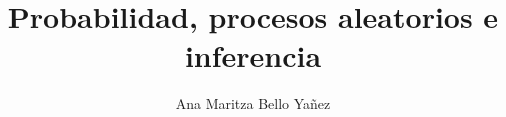 \documentclass{article}
\begin{document}
\title{Probabilidad, procesos aleatorios e inferencia}
\author{Ana Maritza Bello Ya\~nez}
\maketitle
\setlength{\parindent}{0pt}
\setlength{\parskip}{1em}

\tableofcontents




%



%



\pagebreak
 

\end{document}
